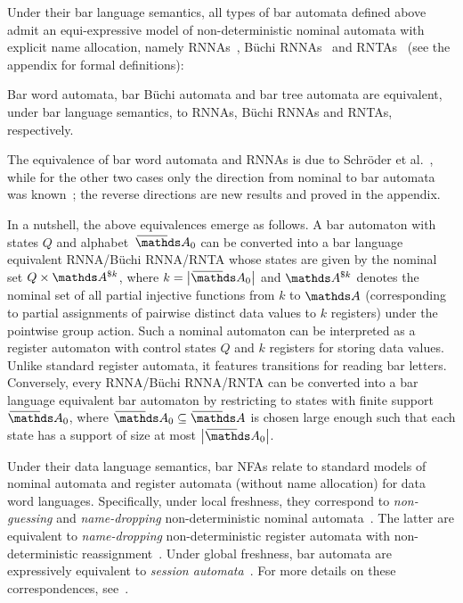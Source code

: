 \documentclass[a4paper,UKenglish,cleveref,autoref,thm-restate,numberwithinsect,final]{lipics-v2021}
\begin{document}
 Under their bar language semantics, all types of bar automata defined above admit an equi-expressive model of non-deterministic nominal automata with explicit name allocation, namely RNNAs~\cite{skmw17}, Büchi RNNAs~\cite{uhms21} and RNTAs~\cite{ps24} (see the appendix for formal definitions):
\begin{theorem}\label{thm:bar-vs-rnna}
Bar word automata, bar Büchi automata and bar tree automata are equivalent, under bar language semantics, to RNNAs, Büchi RNNAs and RNTAs, respectively.
\end{theorem}

The equivalence of bar word automata and RNNAs is due to Schröder et al.~\cite{skmw17}, while for the other two cases only the direction from nominal to bar automata was known~\cite{uhms21,ps24}; the reverse directions are new results and proved in the appendix.

In a nutshell, the above equivalences emerge as follows. A bar automaton with states $Q$ and alphabet~$\barNames_0$ can be converted into a bar language equivalent RNNA/Büchi RNNA/RNTA whose states are given by the nominal set $Q\times \names^{\$ k}$, where $k=\card{\barNames_0}$ and $\names^{\$ k}$ denotes the nominal set of all partial injective functions from $k$ to $\names$ (corresponding to partial assignments of pairwise distinct data values to $k$ registers) under the pointwise group action. Such a nominal automaton can be interpreted as a register automaton with control states $Q$ and $k$ registers for storing data values. Unlike standard register automata, it features transitions for reading bar letters. Conversely, every RNNA/Büchi RNNA/RNTA can be converted into a bar language equivalent bar automaton by restricting to states with finite support $\barNames_0$, where $\barNames_0\seq \barNames$ is chosen large enough such that each state has a support of size at most $\card{\barNames_0}$.

Under their data language semantics, bar NFAs relate to standard models of nominal automata and register automata (without name allocation) for data word languages. Specifically, under local freshness, they correspond to \emph{non-guessing} and \emph{name-dropping} non-deterministic nominal automata~\cite{BojanczykEA14}. The latter are equivalent to 
            \emph{name-dropping} non-deterministic register automata with non-deterministic reassignment~\cite{KaminskiZeitlin10}.
            Under global freshness, bar automata are expressively equivalent to \emph{session automata}~\cite{BolligHLM13}. For more details on these correspondences, see~\cite[Sec.~6]{skmw17}.
\end{document}
